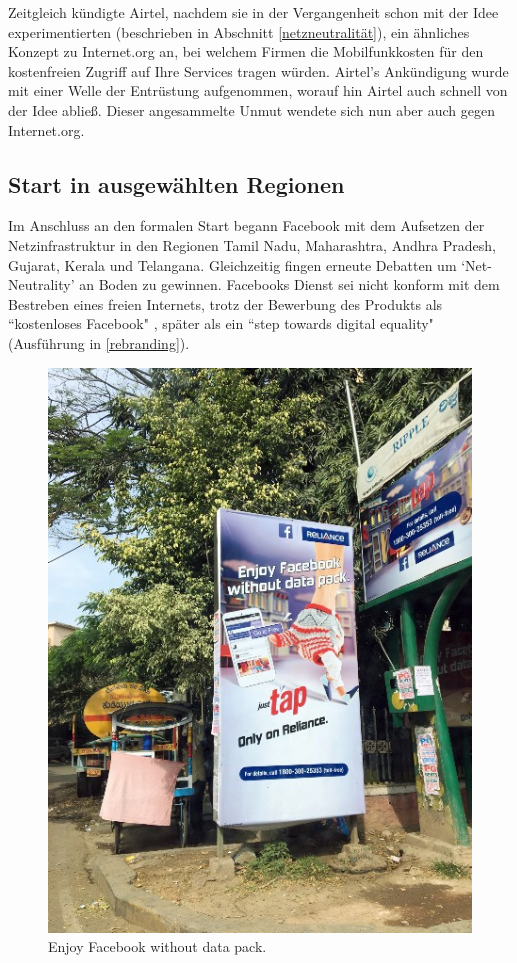 \documentclass{article}
\begin{document}
\medskip

Zeitgleich kündigte Airtel, nachdem sie in der Vergangenheit schon mit der Idee experimentierten (beschrieben in Abschnitt \ref{netzneutralität}), ein ähnliches Konzept zu Internet.org an, bei welchem Firmen die Mobilfunkkosten für den kostenfreien Zugriff auf Ihre Services tragen würden.
Airtel's Ankündigung wurde mit einer Welle der Entrüstung aufgenommen, worauf hin Airtel auch schnell von der Idee abließ.
Dieser angesammelte Unmut wendete sich nun aber auch gegen Internet.org.

\subsection{Start in ausgewählten Regionen}

Im Anschluss an den formalen Start begann Facebook mit dem Aufsetzen der Netzinfrastruktur in den Regionen Tamil Nadu, Maharashtra, Andhra Pradesh, Gujarat, Kerala und Telangana.
Gleichzeitig fingen erneute Debatten um `Net-Neutrality' an Boden zu gewinnen.
Facebooks Dienst sei nicht konform mit dem Bestreben eines freien Internets, trotz der Bewerbung des Produkts als ``kostenloses Facebook" \parencite[3]{prasad2017}, später als ein ``step towards digital equality" (Ausführung in \ref{rebranding}).

\begin{figure}[h!]
  \begin{center}
    \includegraphics[scale=0.4]{wo-data-pack}
    \caption{Enjoy Facebook without data pack\autocite{woData}.}
  \end{center}
\end{figure}
\end{document}
